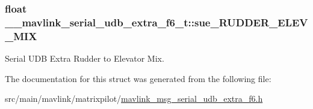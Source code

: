\hypertarget{struct____mavlink__serial__udb__extra__f6__t_ab8552b3ff29bf892e3c5a708130686ba}{
\subsubsection[{sue\+\_\+\+R\+U\+D\+D\+E\+R\+\_\+\+E\+L\+E\+V\+\_\+\+M\+I\+X}]{\setlength{\rightskip}{0pt plus 5cm}float \+\_\+\+\_\+mavlink\+\_\+serial\+\_\+udb\+\_\+extra\+\_\+f6\+\_\+t\+::sue\+\_\+\+R\+U\+D\+D\+E\+R\+\_\+\+E\+L\+E\+V\+\_\+\+M\+I\+X}}\label{struct____mavlink__serial__udb__extra__f6__t_ab8552b3ff29bf892e3c5a708130686ba}


Serial U\+D\+B Extra Rudder to Elevator Mix. 



The documentation for this struct was generated from the following file\+:\begin{DoxyCompactItemize}
\item 
src/main/mavlink/matrixpilot/\hyperlink{mavlink__msg__serial__udb__extra__f6_8h}{mavlink\+\_\+msg\+\_\+serial\+\_\+udb\+\_\+extra\+\_\+f6.\+h}\end{DoxyCompactItemize}
